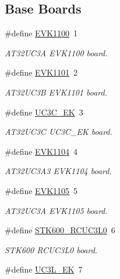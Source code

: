 \subsection*{Base Boards}
\begin{DoxyCompactItemize}
\item 
\#define \hyperlink{group__group__common__boards_gaf70755335cc477c22a31a4126deddbcc}{E\-V\-K1100}~1
\begin{DoxyCompactList}\small\item\em A\-T32\-U\-C3\-A E\-V\-K1100 board. \end{DoxyCompactList}\item 
\#define \hyperlink{group__group__common__boards_gace9c401dee7de17633d3edb4a773a842}{E\-V\-K1101}~2
\begin{DoxyCompactList}\small\item\em A\-T32\-U\-C3\-B E\-V\-K1101 board. \end{DoxyCompactList}\item 
\#define \hyperlink{group__group__common__boards_ga134b9977e8acdca22a47a93daad9112d}{U\-C3\-C\-\_\-\-E\-K}~3
\begin{DoxyCompactList}\small\item\em A\-T32\-U\-C3\-C U\-C3\-C\-\_\-\-E\-K board. \end{DoxyCompactList}\item 
\#define \hyperlink{group__group__common__boards_ga98bb86fc9e11beea9c609d63393ae3ff}{E\-V\-K1104}~4
\begin{DoxyCompactList}\small\item\em A\-T32\-U\-C3\-A3 E\-V\-K1104 board. \end{DoxyCompactList}\item 
\#define \hyperlink{group__group__common__boards_ga478ade34a9b0eb7dca14eb3f9b2f1b5a}{E\-V\-K1105}~5
\begin{DoxyCompactList}\small\item\em A\-T32\-U\-C3\-A E\-V\-K1105 board. \end{DoxyCompactList}\item 
\#define \hyperlink{group__group__common__boards_ga57e3c9540f0da9fc1135acba6cbaf253}{S\-T\-K600\-\_\-\-R\-C\-U\-C3\-L0}~6
\begin{DoxyCompactList}\small\item\em S\-T\-K600 R\-C\-U\-C3\-L0 board. \end{DoxyCompactList}\item 
\#define \hyperlink{group__group__common__boards_ga5119b352b04e0aad2323dc952a385995}{U\-C3\-L\-\_\-\-E\-K}~7

\end{DoxyCompactItemize}
